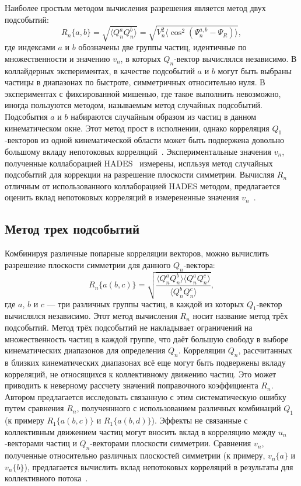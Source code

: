 Наиболее простым методом вычисления разрешения является метод двух подсобытий:
%
\begin{equation}
    R_n\{a,b\} = \sqrt{ \langle Q_n^a Q_n^b \rangle } = \sqrt{ V_n^2 \langle \cos^{2}( \Psi^{a,b}_n - \Psi_R ) \rangle },
\end{equation}
где индексами $a$ и $b$ обозначены две группы частиц, идентичные по множественности и значению $v_n$, в которых $Q_n$-вектор вычислялся независимо.
В коллайдерных экспериментах, в качестве подсобытий $a$ и $b$ могут быть выбраны частицы в диапазонах по быстроте, симметричных относительно нуля.
В экспериментах с фиксированной мишенью, где такое выполнить невозможно, иногда пользуются методом, называемым метод случайных подсобытий.
Подсобытия $a$ и $b$ набираются случайным образом из частиц в данном кинематическом окне.
Этот метод прост в исполнении, однако корреляция $Q_1$-векторов из одной кинематической области может быть подвержена довольно большому вкладу непотоковых корреляций~\cite{Mamaev:2020lpi}.
Экспериментальные значения $v_n$, полученные коллаборацией HADES~\cite{HADES:2020lob} измерены, испльзуя метод случайных подсобытий для коррекции на разрешение плоскости симметрии. 
Вычисляя $R_n$ отличным от использованного коллаборацией HADES методом, предлагается оценить вклад непотоковых корреляций в измерененные значения $v_n$~\cite{Mamaev:2020lpi, Mamaev:2020qom}.

\subsection{Метод трех подсобытий}

Комбинируя различные попарные корреляции векторов, можно вычислить разрешение плоскости симметрии для данного $Q_n$-вектора:
%
\begin{equation}
    R_n\{a(b,c)\}  =  \sqrt { \frac{ \langle Q_n^a Q_n^b \rangle \langle Q_n^a Q_n^c \rangle }{ \langle Q_n^b Q_n^c \rangle} },
\end{equation}
%
где $a$, $b$ и $c$ --- три различных группы частиц, в каждой из которых $Q_1$-вектор вычислялся независимо.
Этот метод вычисления $R_n$ носит название метод трёх подсобытий.
Метод трёх подсобытий не накладывает ограничений на множественность частиц в каждой группе, что даёт большую свободу в выборе кинематических диапазонов для определения $Q_n$.
Корреляции $Q_n$, рассчитанных в близких кинематических диапазонах всё еще могут быть подвержены вкладу корреляций, не относящихся к коллективному движению частиц.
Это может приводить к неверному рассчету значений поправочного коэффициента $R_n$.
Автором предлагается исследовать связанную с этим систематическую ошибку путем сравнения $R_n$, полученнного с использованием различных комбинаций $Q_1$ (к примеру $R_1\{a(b,c)\}$ и $R_1\{a(b,d)\}$).
Эффекты не связанные с коллективным движением частиц могут вносить вклад в корреляцию между $u_n$-векторами частиц и $Q_n$-векторами плоскости симметрии.
Сравнения $v_n$, полученные относительно различных плоскостей симметрии (к примеру, $v_n\{a\}$ и $v_n\{b\}$), предлагается вычислить вклад непотоковых корреляций в результаты для коллективного потока~\cite{Mamaev:2020qom,Mamaev:2023fpr,Mamaev:2023yhz,Mamaev:2024}. 

